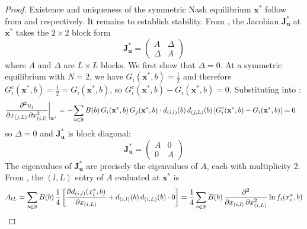 \documentclass{article}
\begin{document}
            \begin{proof}
                Existence and uniqueness of the symmetric Nash equilibrium $\mathbf{x}^*$ follow from  and  respectively. It remains to establish stability. From , the Jacobian $\mathbf{J}_{\mathbf{u}}^*$ at $\mathbf{x}^*$ takes the $2\times 2$ block form
                \begin{equation}
                    \mathbf{J}_{\mathbf{u}}^* = \begin{pmatrix} A & \Delta \\ \Delta & A \end{pmatrix}
                \end{equation}
                where $A$ and $\Delta$ are $L \times L$ blocks. We first show that $\Delta = 0$. At a symmetric equilibrium with $N=2$, we have $G_i(\mathbf{x}^*,b) = \frac{1}{2}$ and therefore $G_i^c(\mathbf{x}^*,b) = \frac{1}{2} = G_i(\mathbf{x}^*,b)$, so $G_i^c(\mathbf{x}^*,b) - G_i(\mathbf{x}^*,b) = 0$. Substituting into :
                \begin{align}
                    \pdv[2]{u_i}{x_{(j,L)}\,\partial x_{(i,l)}}\bigg|_{\mathbf{x}^*} 
                    &= -\sum_{b\in\mathbb{B}} B(b)\, G_i(\mathbf{x}^*,b)\, G_j(\mathbf{x}^*,b)
                    \cdot d_{(i,l)}(b)\, d_{(j,L)}(b)
                    \left[G_i^c(\mathbf{x}^*,b) - G_i(\mathbf{x}^*,b)\right] = 0
                \end{align}
                so $\Delta = 0$ and $\mathbf{J}_{\mathbf{u}}^*$ is block diagonal:
                \begin{equation}
                    \mathbf{J}_{\mathbf{u}}^* = \begin{pmatrix} A & 0 \\ 0 & A \end{pmatrix}
                \end{equation}
                The eigenvalues of $\mathbf{J}_{\mathbf{u}}^*$ are precisely the eigenvalues of $A$, each with multiplicity 2. From , the $(l, L)$ entry of $A$ evaluated at $\mathbf{x}^*$ is
                \begin{equation}
                    A_{lL} = \sum_{b\in\mathbb{B}} B(b)\, \frac{1}{4}
                    \left[\pdv{d_{(i,l)}(x_i^*,b)}{x_{(i,L)}} + 
                    d_{(i,l)}(b)\, d_{(i,L)}(b)
                    \cdot 0\right] = \frac{1}{4}\sum_{b\in\mathbb{B}} B(b)\, 
                    \pdv[2]{}{x_{(i,l)}\,\partial x_{(i,L)}}\ln f_i(x_i^*,b)

\end{equation}
\end{proof}
\end{document}

